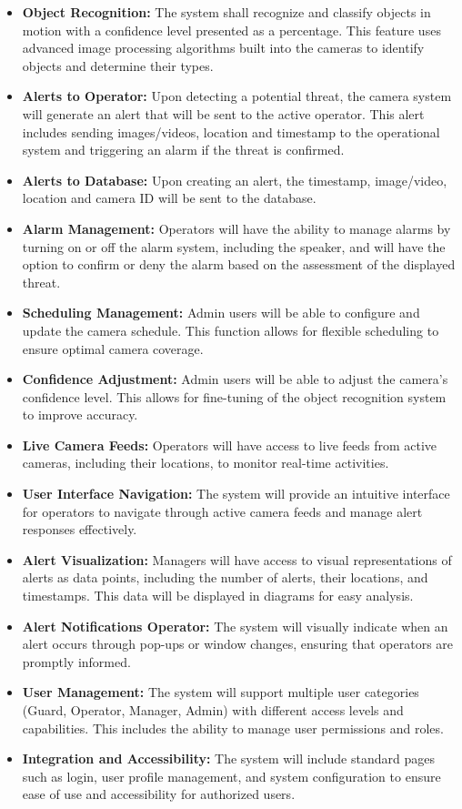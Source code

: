 \documentclass{article}
\begin{document}
\begin{itemize}
    \item \textbf{Object Recognition:} The system shall recognize and classify objects in motion with a confidence level presented as a percentage. This feature uses advanced image processing algorithms built into the cameras to identify objects and determine their types.
    \item \textbf{Alerts to Operator:} Upon detecting a potential threat, the camera system will generate an alert that will be sent to the active operator. This alert includes sending images/videos, location and timestamp to the operational system and triggering an alarm if the threat is confirmed.
    \item \textbf{Alerts to Database:} Upon creating an alert, the timestamp, image/video, location and camera ID will be sent to the database.
    \item \textbf{Alarm Management:} Operators will have the ability to manage alarms by turning on or off the alarm system, including the speaker, and will have the option to confirm or deny the alarm based on the assessment of the displayed threat.
    \item \textbf{Scheduling Management:} Admin users will be able to configure and update the camera schedule. This function allows for flexible scheduling to ensure optimal camera coverage.
    \item \textbf{Confidence Adjustment:} Admin users will be able to adjust the camera’s confidence level. This allows for fine-tuning of the object recognition system to improve accuracy.
    \item \textbf{Live Camera Feeds:} Operators will have access to live feeds from active cameras, including their locations, to monitor real-time activities.
    \item \textbf{User Interface Navigation:} The system will provide an intuitive interface for operators to navigate through active camera feeds and manage alert responses effectively.
    \item \textbf{Alert Visualization:} Managers will have access to visual representations of alerts as data points, including the number of alerts, their locations, and timestamps. This data will be displayed in diagrams for easy analysis.
    \item \textbf{Alert Notifications Operator:} The system will visually indicate when an alert occurs through pop-ups or window changes, ensuring that operators are promptly informed.
    \item \textbf{User Management:} The system will support multiple user categories (Guard, Operator, Manager, Admin) with different access levels and capabilities. This includes the ability to manage user permissions and roles.
    \item \textbf{Integration and Accessibility:} The system will include standard pages such as login, user profile management, and system configuration to ensure ease of use and accessibility for authorized users.
\end{itemize}
\end{document}
